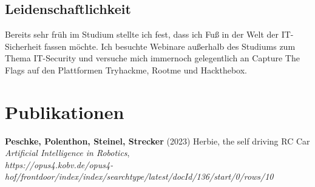 \documentclass[
	10pt, %
]{FreemanCV}
\begin{document}
\begin{paracol}{2}
\subsection{Leidenschaftlichkeit}

Bereits sehr früh im Studium stellte ich fest, dass ich Fuß in der Welt der IT-Sicherheit fassen möchte. Ich besuchte Webinare außerhalb des Studiums zum Thema IT-Security und versuche mich
immernoch gelegentlich an Capture The Flags auf den Plattformen Tryhackme, Rootme und Hackthebox.


\section{Publikationen}


\textbf{Peschke, Polenthon, Steinel, Strecker} (2023) Herbie, the self driving RC Car \textit{Artificial Intelligence in Robotics},\\ \textit{https://opus4.kobv.de/opus4-hof/frontdoor/index/index/\newline searchtype/latest/docId/136/start/0/rows/10}

\medskip %


\medskip %








\end{paracol}
\end{document}
